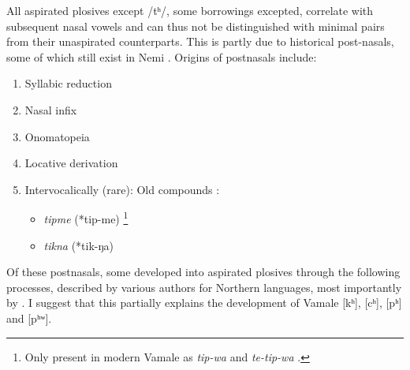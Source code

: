 All aspirated plosives except /tʰ/, some borrowings excepted, correlate with subsequent nasal vowels and can thus not be distinguished with minimal pairs from their unaspirated counterparts.%
This is partly due to historical post-nasals, some of which still exist in Nemi \parencite[19]{ozanne-rivierre_phonologie_1982}. %
	Origins of postnasals include:
	\begin{enumerate}
		\item Syllabic reduction 
		\item Nasal infix
		\item Onomatopeia
		\item Locative derivation 
		\item Intervocalically (rare): Old compounds \parencite[30]{ozanne-rivierre_phonologie_1982}:
		\begin{itemize}
			\item \textit{tipme} (*tip-me) \footnote{Only present in modern Vamale as \textit{tip-wa}  and \textit{te-tip-wa} .}
			\item \textit{tikna} (*tik-ŋa) 
		\end{itemize}
	\end{enumerate}
	
Of these postnasals, some developed into aspirated plosives through the following processes, described by various authors for Northern languages, most importantly by \citet[28--30]{ozanne-rivierre_phonologie_1982}. I suggest that this partially explains the development of Vamale [kʰ], [cʰ], [pʰ] and [pʰʷ].%
	
